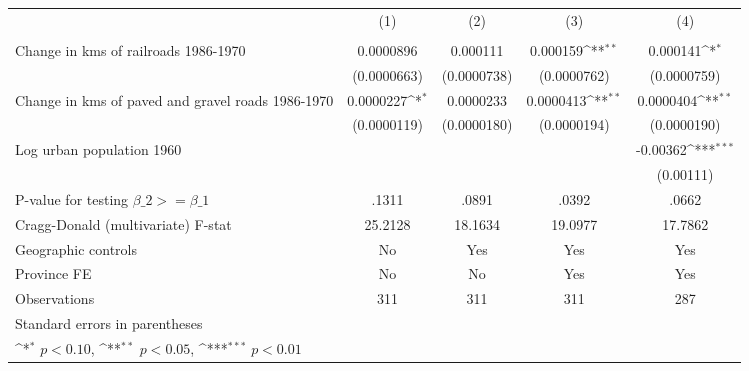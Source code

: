 {
\def\sym#1{\ifmmode^{#1}\else\(^{#1}\)\fi}
\begin{tabular}{l*{4}{c}}
\hline\hline
                &\multicolumn{1}{c}{(1)}&\multicolumn{1}{c}{(2)}&\multicolumn{1}{c}{(3)}&\multicolumn{1}{c}{(4)}\\
                &\multicolumn{1}{c}{}&\multicolumn{1}{c}{}&\multicolumn{1}{c}{}&\multicolumn{1}{c}{}\\
\hline
Change in kms of railroads 1986-1970&0.0000896         & 0.000111         & 0.000159\sym{**} & 0.000141\sym{*}  \\
                &(0.0000663)         &(0.0000738)         &(0.0000762)         &(0.0000759)         \\
[1em]
Change in kms of paved and gravel roads 1986-1970&0.0000227\sym{*}  &0.0000233         &0.0000413\sym{**} &0.0000404\sym{**} \\
                &(0.0000119)         &(0.0000180)         &(0.0000194)         &(0.0000190)         \\
[1em]
Log urban population 1960&                  &                  &                  & -0.00362\sym{***}\\
                &                  &                  &                  &(0.00111)         \\
\hline
P-value for testing $\beta\_{2} >= \beta\_{1}$&    .1311         &    .0891         &    .0392         &    .0662         \\
Cragg-Donald (multivariate) F-stat&  25.2128         &  18.1634         &  19.0977         &  17.7862         \\
Geographic controls&       No         &      Yes         &      Yes         &      Yes         \\
Province FE     &       No         &       No         &      Yes         &      Yes         \\
Observations    &      311         &      311         &      311         &      287         \\
\hline\hline
\multicolumn{5}{l}{\footnotesize Standard errors in parentheses}\\
\multicolumn{5}{l}{\footnotesize \sym{*} \(p<0.10\), \sym{**} \(p<0.05\), \sym{***} \(p<0.01\)}\\
\end{tabular}
}

